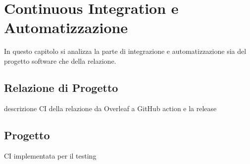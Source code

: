 \section{Continuous Integration e Automatizzazione}
\label{chap:CI}
In questo capitolo si analizza la parte di integrazione e automatizzazione sia del progetto software che della relazione. 
    \subsection{Relazione di Progetto}
        descrizione CI della relazione da Overleaf a GitHub action e la release

    \subsection{Progetto}
        CI implementata per il testing 
        
        





